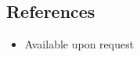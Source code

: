 \documentclass[margin]{res}
\begin{document}
\begin{resume}
\section{References}
\begin{itemize} \itemsep -2pt
\item Available upon request
\end{itemize}
\end{resume}
\end{document}
